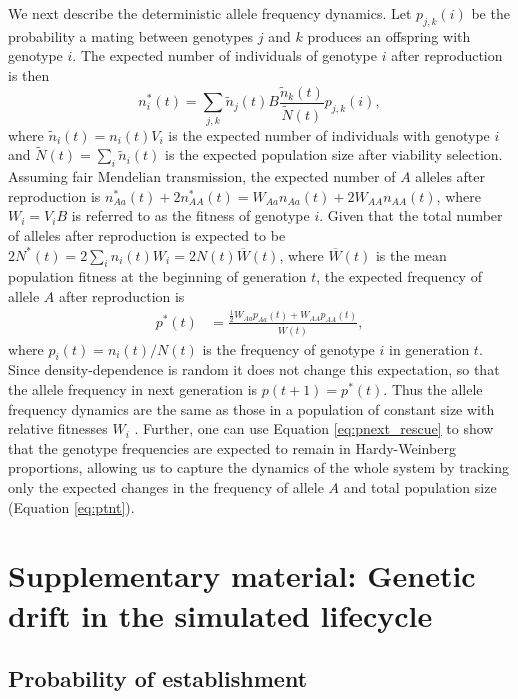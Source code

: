 \documentclass[]{article}
\begin{document}
We next describe the deterministic allele frequency dynamics.
Let $p_{j,k}(i)$ be the probability a mating between genotypes $j$ and $k$ produces an offspring with genotype $i$.
The expected number of individuals of genotype $i$ after reproduction is then  
\begin{equation}
n_i^*(t) = \sum_{j,k} \tilde{n}_j(t) B \frac{\tilde{n}_k(t)}{\tilde{N}(t)}p_{j,k}(i),
\end{equation}
where $\tilde{n}_i(t) = n_i(t) V_i$ is the expected number of individuals with genotype $i$ and $\tilde{N}(t) = \sum_i{\tilde{n}_i(t)}$ is the expected population size after viability selection.
Assuming fair Mendelian transmission, the expected number of $A$ alleles after reproduction is $n_{Aa}^*(t) + 2n_{AA}^*(t) = W_{Aa} n_{Aa}(t) + 2 W_{AA} n_{AA}(t)$, where $W_i = V_i B$ is referred to as the fitness of genotype $i$.
Given that the total number of alleles after reproduction is expected to be $2N^*(t) = 2\sum_i n_i(t) W_i = 2N(t) \overline{W}(t)$, where $\overline{W}(t)$ is the mean population fitness at the beginning of generation $t$, the expected frequency of allele $A$ after reproduction is
\begin{equation}\label{eq:pnext_rescue}
\begin{aligned}
p^*(t) &= \frac{\frac{1}{2} W_{Aa} p_{Aa}(t) + W_{AA} p_{AA}(t)}{\overline{W}(t)},
\end{aligned}
\end{equation}
where $p_i(t)=n_i(t)/N(t)$ is the frequency of genotype $i$ in generation $t$.
Since density-dependence is random it does not change this expectation, so that the allele frequency in next generation is $p(t+1)=p^*(t)$.
Thus the allele frequency dynamics are the same as those in a population of constant size with relative fitnesses $W_i$ \citep[equation 5.2.3 in][]{crow1970introduction}.
Further, one can use Equation \ref{eq:pnext_rescue} to show that the genotype frequencies are expected to remain in Hardy-Weinberg proportions, allowing us to capture the dynamics of the whole system by tracking only the expected changes in the frequency of allele $A$ and total population size (Equation \ref{eq:ptnt}).

\section*{Supplementary material: Genetic drift in the simulated lifecycle}
\label{sec:pestNe}

\subsection*{Probability of establishment}
\end{document}
